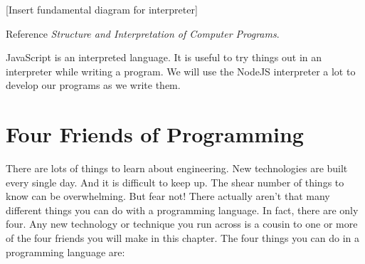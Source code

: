 [Insert fundamental diagram for interpreter]

Reference \textit{Structure and Interpretation of Computer Programs}.

JavaScript is an interpreted language. It is useful to try things out in an interpreter while writing a program. We will use the NodeJS interpreter a lot to develop our programs as we write them.

\section{Four Friends of Programming}

There are lots of things to learn about engineering. New technologies are built every single day. And it is difficult to keep up. The shear number of things to know can be overwhelming. But fear not! There actually aren't that many different things you can do with a programming language. In fact, there are only four. Any new technology or technique you run across is a cousin to one or more of the four friends you will make in this chapter. The four things you can do in a programming language are:

